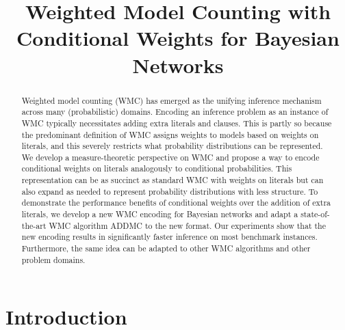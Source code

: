 \documentclass{article}
\title{Weighted Model Counting with Conditional Weights for Bayesian Networks}
\begin{document}
\maketitle

\begin{abstract}
  Weighted model counting (WMC) has emerged as the unifying inference mechanism
  across many (probabilistic) domains. Encoding an inference problem as an
  instance of WMC typically necessitates adding extra literals and clauses. This
  is partly so because the predominant definition of WMC assigns weights to
  models based on weights on literals, and this severely restricts what
  probability distributions can be represented. We develop a measure-theoretic
  perspective on WMC and propose a way to encode conditional weights on literals
  analogously to conditional probabilities. This representation can be as
  succinct as standard WMC with weights on literals but can also expand as
  needed to represent probability distributions with less structure. To
  demonstrate the performance benefits of conditional weights over the addition
  of extra literals, we develop a new WMC encoding for Bayesian networks and
  adapt a state-of-the-art WMC algorithm ADDMC to the new format. Our
  experiments show that the new encoding results in significantly faster
  inference on most benchmark instances. Furthermore, the same idea can be
  adapted to other WMC algorithms and other problem domains.
\end{abstract}

\section{Introduction}
\end{document}
